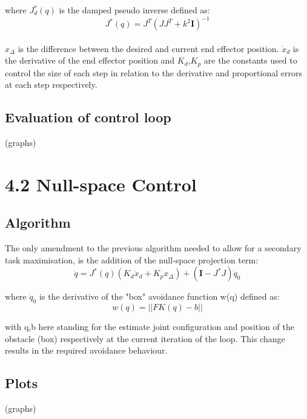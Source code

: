 \documentclass{report}
\begin{document}
\noindent where $J^{\text{*}}_{d}(q) $ is the damped pseudo inverse defined as:
\begin{equation*}
    J^{\text{*}}(q) = J^{T}(JJ^{T} + \mathit{k}^{2}\mathbf{I})^{-1}
\end{equation*}\\

\noindent $x_{\Delta}$ is the difference between the desired and current end effector position.
\noindent $\dot{x}_{d}$ is the derivative of the end effector position and $K_{d}$,$K_{p}$ are the constants used to control the size of each step in relation to the derivative and proportional errors at each step respectively.

\subsection*{Evaluation of control loop}
(graphs)

\section*{4.2 Null-space Control}
\subsection*{Algorithm}
The only amendment to the previous algorithm needed to allow for a secondary task maximisation, is the addition of the null-space projection term:
\begin{equation*}
    \dot{q} = J^{\text{*}}(q) (K_{d} \dot{x}_{d} + K_{p}x_{\Delta} ) + (\mathbf{I} - J^{\text{*}}J )\dot{q}_{0}
\end{equation*}

\noindent where $\dot{q}_{0}$ is the derivative of the "box" avoidance function w(q) defined as:
\begin{equation*}
    w(q) = || FK(q) - b ||
\end{equation*}

\noindent with q,b here standing for the estimate joint configuration and position of the obstacle (box) respectively at the current iteration of the loop. This change results in the required avoidance behaviour.

\subsection*{Plots}
(graphs)
\end{document}
